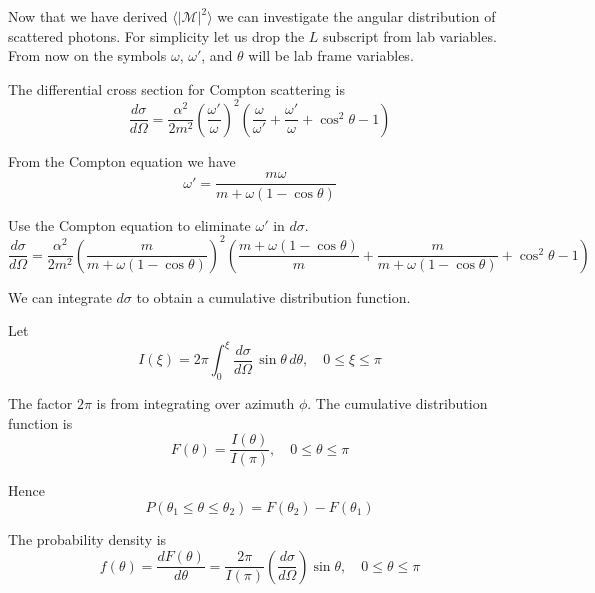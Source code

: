 \documentclass[12pt]{article}
\begin{document}
Now that we have derived $\langle|\mathcal{M}|^2\rangle$
we can investigate the angular distribution of scattered photons.
For simplicity let us drop the $L$ subscript from lab variables.
From now on the symbols $\omega$, $\omega'$, and $\theta$ will be lab frame variables.

\bigskip
\noindent
The differential cross section for Compton scattering is
\begin{equation*}
\frac{d\sigma}{d\Omega}=\frac{\alpha^2}{2m^2}
\left(\frac{\omega'}{\omega}\right)^2
\left(
\frac{\omega}{\omega'}+\frac{\omega'}{\omega}+\cos^2\theta-1
\right)
\end{equation*}

\noindent
From the Compton equation we have
\begin{equation*}
\omega'=\frac{m\omega}{m+\omega(1-\cos\theta)}
\end{equation*}

\noindent
Use the Compton equation to eliminate $\omega'$ in $d\sigma$.
\begin{equation*}
\frac{d\sigma}{d\Omega}=\frac{\alpha^2}{2m^2}
\left(\frac{m}{m+\omega(1-\cos\theta)}\right)^2
\left(
\frac{m+\omega(1-\cos\theta)}{m}
+\frac{m}{m+\omega(1-\cos\theta)}+\cos^2\theta-1
\right)
\end{equation*}

\noindent
We can integrate $d\sigma$ to obtain a cumulative distribution function.

\bigskip
\noindent
Let
\begin{equation*}
I(\xi)=2\pi\int_0^\xi\frac{d\sigma}{d\Omega}\,\sin\theta\,d\theta,
\quad0\le\xi\le\pi
\end{equation*}

\noindent
The factor $2\pi$ is from integrating over azimuth $\phi$.
The cumulative distribution function is
\begin{equation*}
F(\theta)=\frac{I(\theta)}{I(\pi)},
\quad0\le\theta\le\pi
\end{equation*}

\noindent
Hence\begin{equation*}
P(\theta_1\le\theta\le\theta_2)=F(\theta_2)-F(\theta_1)
\end{equation*}

\noindent
The probability density is
\begin{equation*}
f(\theta)=\frac{dF(\theta)}{d\theta}
=\frac{2\pi}{I(\pi)}
\left(\frac{d\sigma}{d\Omega}\right)\sin\theta,
\quad0\le\theta\le\pi
\end{equation*}
\end{document}
